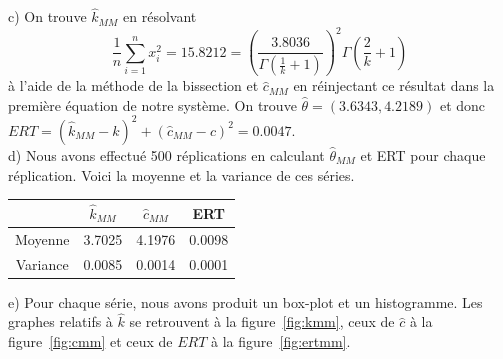 c) On trouve $\hat{k}_{MM}$ en résolvant 
$$ \frac{1}{n}\sum\limits_{i=1}^n x_i ^2 = 15.8212 = \left(\frac{3.8036}{\Gamma\left(\frac{1}{k}+1\right)}\right)^2\Gamma\left(\frac{2}{k}+1\right)$$
à l'aide de la méthode de la bissection et $\hat{c}_{MM}$ en réinjectant ce résultat dans la première équation de notre système. On trouve $\hat{\theta} = (3.6343,4.2189)$ et donc $ERT = (\hat{k}_{MM} - k)^2 +(\hat{c}_{MM} - c)^2 = 0.0047$. \\

d) Nous avons effectué 500 réplications en calculant $\hat{\theta}_{MM}$ et ERT pour chaque réplication. Voici la moyenne et la variance de ces séries.
\begin{center}
\begin{tabular}{|c|c|c|c|}
  \hline
   &  $\hat{k}_{MM}$ & $\hat{c}_{MM}$ & ERT \\
  \hline
  Moyenne & 3.7025 & 4.1976 & 0.0098 \\
  Variance & 0.0085 & 0.0014 & 0.0001 \\
  \hline
\end{tabular}
\end{center}

e) Pour chaque série, nous avons produit un box-plot et un histogramme. Les graphes relatifs à $\hat{k}$ se retrouvent à la figure~\ref{fig:kmm}, ceux de $\hat{c}$ à la figure~\ref{fig:cmm} et ceux de $ERT$ à la figure~\ref{fig:ertmm}.\\

